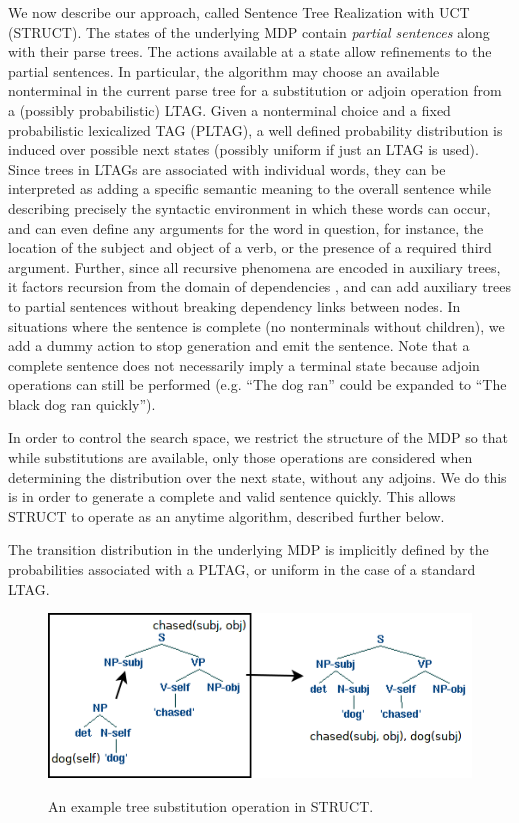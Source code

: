 We now describe our approach, called Sentence Tree Realization with
UCT (STRUCT). The states of the underlying MDP contain {\em partial
  sentences} along with their parse trees. The actions available at a
state allow refinements to the partial sentences. In particular, the
algorithm may choose an available nonterminal in the current parse
tree for a substitution or adjoin operation from a (possibly
probabilistic) LTAG. Given a nonterminal choice and a fixed
probabilistic lexicalized TAG (PLTAG), a well defined probability
distribution is induced over possible next states (possibly uniform if
just an LTAG is used).   Since trees in LTAGs are associated
with individual words, they can be interpreted as adding a specific
semantic meaning to the overall sentence while describing precisely
the syntactic environment in which these words can occur, and can even
define any arguments for the word in question, for instance, the
location of the subject and object of a verb, or the presence of a
required third argument.  Further, since all recursive phenomena are
encoded in auxiliary trees, it factors recursion from the domain of
dependencies \cite{bauer2009statistical}, and can add auxiliary trees
to partial sentences without breaking dependency links between nodes.
In situations where the sentence is complete (no nonterminals without
children), we add a dummy action to stop generation and emit the
sentence.  Note that a complete sentence does not necessarily imply
a terminal state because adjoin operations can still be performed
(e.g. ``The dog ran'' could be expanded to ``The black dog ran quickly'').

In order to control the search space, we restrict the structure of the
MDP so that while substitutions are available, only those operations
are considered when determining the distribution over the next state,
without any adjoins.  We do this is in order to generate a
complete and valid sentence quickly.  This allows STRUCT to operate as
an anytime algorithm, described further below.

 The transition distribution in
 the underlying MDP is implicitly defined by the probabilities
 associated with a PLTAG, or uniform in the case of a standard LTAG.
\begin{figure}[t]
\centering
\includegraphics[width= 0.7 \linewidth]{sub-example.png}\label{examples}
\caption{An example tree substitution operation in STRUCT.}
\end{figure}

